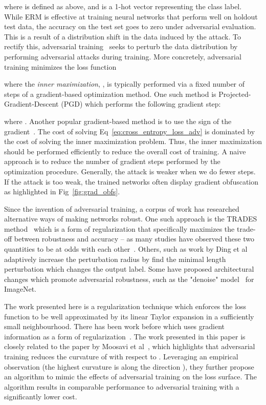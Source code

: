 \documentclass{article}
\theoremstyle{plain}
\theoremstyle{definition}
\theoremstyle{remark}
\begin{document}
where  is defined as above, and  is a 1-hot vector representing the class label. While ERM is effective at training neural networks that perform well on holdout test data, the accuracy on the test set goes to zero under adversarial evaluation. This is a result of a distribution shift in the data induced by the attack. To rectify this, adversarial training~\cite{moosavi2018robustness, kurakin2016adversarial} seeks to perturb the data distribution by performing adversarial attacks during training. More concretely, adversarial training minimizes the loss function

where the {\it inner maximization}, , is typically performed via a fixed number of steps of a gradient-based optimization method. One such method is Projected-Gradient-Descent (PGD) which performs the following gradient step:

where . Another popular gradient-based method is to use the sign of the gradient~\citep{goodfellow2014explaining}. 
The cost of solving Eq~\eqref{eq:cross_entropy_loss_adv} is dominated by the cost of solving the inner maximization problem. Thus, the inner maximization should be performed efficiently to reduce the overall cost of training. A naive approach is to reduce the number of gradient steps performed by the optimization procedure. Generally, the attack is weaker when we do fewer steps. If the attack is too weak, the trained networks often display gradient obfuscation as highlighted in Fig~\ref{fig:grad_obfs}. 

Since the invention of adversarial training, a corpus of work has researched alternative ways of making networks robust. One such approach is the TRADES method~\citep{zhang2019theoretically} which is a form of regularization that specifically maximizes the trade-off between robustness and accuracy -- as many studies have observed these two quantities to be at odds with each other~\citep{tsipras2018robustness}. Others, such as work by Ding et al~\citep{ding2018max} adaptively increase the perturbation radius by find the minimal length perturbation which changes the output label. Some have proposed architectural changes which promote adversarial robustness, such as the "denoise" model~\citep{xie2018feature} for ImageNet.



The work presented here is a regularization technique which enforces the loss function to be well approximated by its linear Taylor expansion in a sufficiently small neighbourhood. There has been work before which uses gradient information as a form of regularization~\citep{simard1992tangent, moosavi2018robustness}. The work presented in this paper is closely related to the paper by Moosavi et al~\citep{moosavi2018robustness}, which highlights that adversarial training reduces the curvature of  with respect to . Leveraging an empirical observation (the highest curvature is along the direction ), they further propose an algorithm to mimic the effects of adversarial training on the loss surface. The algorithm results in comparable performance to adversarial training with a significantly lower cost. 
\end{document}
